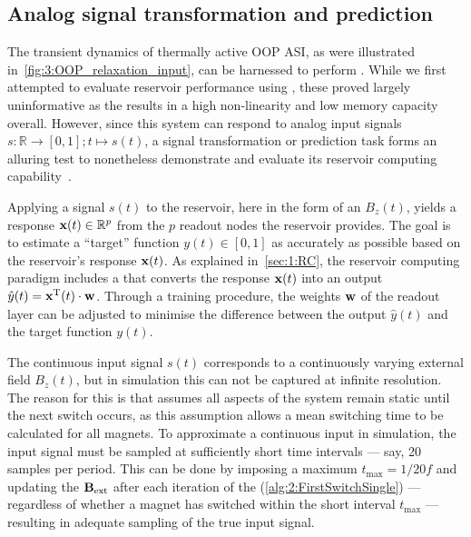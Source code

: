 \subsection{Analog signal transformation and prediction}
The transient dynamics of thermally active OOP ASI, as were illustrated in~\cref{fig:3:OOP_relaxation_input}, can be harnessed to perform .
While we first attempted to evaluate reservoir performance using , these proved largely uninformative as the  results in a high non-linearity and low memory capacity overall.
However, since this system can respond to analog input signals $s: \mathbb{R} \rightarrow [0, 1]; t \mapsto s(t)$, a signal transformation or prediction task forms an alluring test to nonetheless demonstrate and evaluate its reservoir computing capability~\cite{gartside2022reconfigurable,NeuromorphicFewShot,RC_NNN,TaskAdaptivePRC}. \par %
Applying a signal $s(t)$ to the reservoir, here in the form of an  $B_z(t)$, yields a response $\boldsymbol{\mathbf{x}}(t) \in \mathbb{R}^p$ from the $p$ readout nodes the reservoir provides.
The goal is to estimate a ``target'' function $y(t) \in [0,1]$ as accurately as possible based on the reservoir's response $\boldsymbol{\mathbf{x}}(t)$.
As explained in~\cref{sec:1:RC}, the reservoir computing paradigm includes a  that converts the response $\boldsymbol{\mathbf{x}}(t)$ into an output $\hat{y}(t) = \boldsymbol{\mathbf{x}}^\mathrm{T}(t) \cdot \boldsymbol{\mathbf{w}}$.
Through a training procedure, the weights $\boldsymbol{\mathbf{w}}$ of the readout layer can be adjusted to minimise the difference between the output $\hat{y}(t)$ and the target function $y(t)$. \par
The continuous input signal $s(t)$ corresponds to a continuously varying external field $B_z(t)$, but in simulation this can not be captured at infinite resolution.
The reason for this is that \hotspice assumes all aspects of the system remain static until the next switch occurs, as this assumption allows a mean switching time to be calculated for all magnets.
To approximate a continuous input in simulation, the input signal must be sampled at sufficiently short time intervals --- say, 20 samples per period.
This can be done by imposing a maximum  $t_\mathrm{max} = 1/20f$ and updating the  $\boldsymbol{\mathbf{B}}_\mathrm{ext}$ after each iteration of the  (\cref{alg:2:FirstSwitchSingle}) --- regardless of whether a magnet has switched within the short interval $t_\mathrm{max}$ --- resulting in adequate sampling of the true input signal. \\\par

